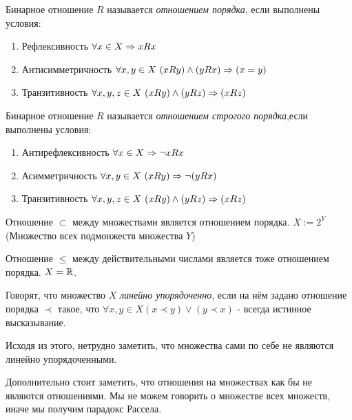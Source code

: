 \begin{definition}
    Бинарное отношение $R$ называется \textit{отношением порядка}, если выполнены условия:
    \begin{enumerate}
        \item Рефлексивность $\forall x \in X \Rightarrow xRx$
        \item Антисимметричность $\forall x, y \in X\ (xRy) \wedge (yRx) \Ra (x = y)$
        \item Транзитивность
        $\forall x, y, z \in X\ (xRy) \wedge (yRz) \Ra (xRz)$
    \end{enumerate}
\end{definition}

\begin{adefinition}
    Бинарное отношение $R$ называется \textit{отношением
    строгого порядка},если выполнены условия:
    \begin{enumerate}
        \item Антирефлексивность $\forall x \in X \Rightarrow \neg xRx$
        \item Асимметричность $\forall x, y \in X\ (xRy) \Ra \neg (yRx)$
        \item Транзитивность
        $\forall x, y, z \in X\ (xRy) \wedge (yRz) \Ra (xRz)$
    \end{enumerate}
\end{adefinition}

\begin{example}
    Отношение $\subset$ между множествами является отношением порядка. $X := 2^{Y}$
    (Множество всех подмонжеств множества $Y$)
\end{example}
\begin{example}
    Отношение $\le$ между действительными числами является тоже отношением порядка. $X = \mathbb{R}$.
\end{example}

\begin{definition}
    Говорят, что множество $X$ \textit{линейно упорядоченно}, если на нём задано отношение порядка $\prec$ такое, что $\forall x, y \in X (x \prec y) \vee (y \prec x)$ - всегда истинное высказывание.
\end{definition}

Исходя из этого, нетрудно заметить, что множества сами по себе не являются линейно упорядоченными.

\begin{anote}
    Дополнительно стоит заметить, что отношения на множествах как бы не являются отношениями. Мы не можем говорить о множестве всех множеств, иначе мы получим парадокс Рассела.
\end{anote}

